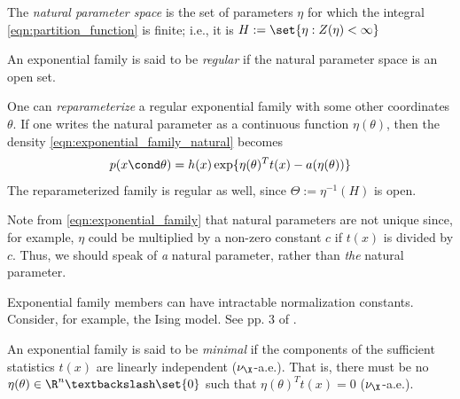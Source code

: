 \documentclass{article} %
\begin{document}
\begin{definition}
The \textit{natural parameter space} is the set of parameters $\eta$ for which the integral \eqref{eqn:partition_function} is finite; i.e., it is $H:=\set{\eta : Z(\eta) < \infty}$
\end{definition}

\begin{definition}
An exponential family is said to be \textit{regular} if the natural parameter space is an open set.
\end{definition}

One can \textit{reparameterize} a regular exponential family with some other coordinates $\theta$.  If one writes the natural parameter as a continuous function $\eta(\theta)$, then the density \eqref{eqn:exponential_family_natural} becomes
\begin{align}
\label{eqn:exponential_family}
 p(x \cond \theta) = h(x) \exp \{ \eta(\theta)^T t(x) - a(\eta(\theta))\} 
 \end{align}
 The reparameterized family is regular as well, since $\Theta := \eta^{-1}(H)$ is open. 
 
\begin{remark}{}
\label{rk:nonuniqueness_of_natural_parameter}
Note from \eqref{eqn:exponential_family} that natural parameters are not unique since,  for example,  $\eta$ could be multiplied by a non-zero constant $c$ if $t(x)$ is divided by $c$.  Thus,  we should speak of \textit{a} natural parameter,  rather than \textit{the} natural parameter.
\end{remark}

\begin{remark}
Exponential family members can have intractable normalization constants.  Consider, for example,  the Ising model.  See pp. 3 of \cite{taylorXXXXmultiparameter}.
\end{remark}


\begin{definition}
An exponential family is said to be \textit{minimal} if the components of the sufficient statistics $t(x)$ are linearly independent ($\nu_\X$-a.e.).  That is, there must be no $\eta(\theta) \in \R^n \textbackslash \set{0}$ such that $\eta(\theta)^T t(x) = 0$ ($\nu_\X$-a.e.).
\end{definition}
\end{document}
